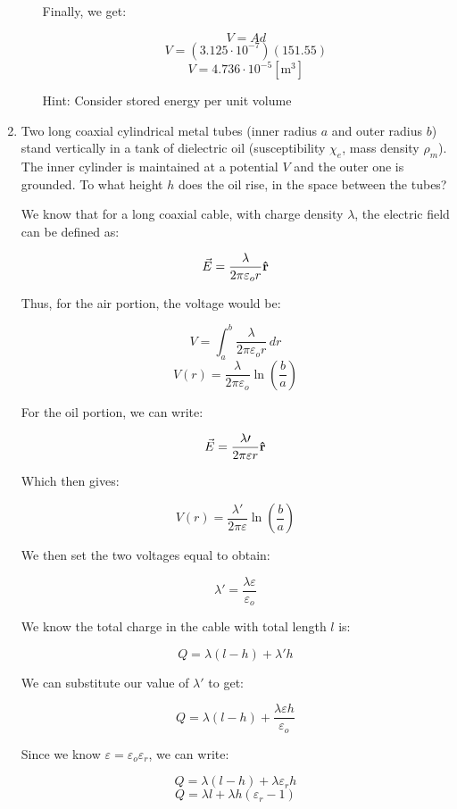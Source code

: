 \begin{enumerate}
\begin{enumerate}
        Finally, we get:

        $$V=Ad$$
        $$V=\left( 3.125\cdot10^{-7} \right)\left( 151.55 \right)$$
        $$\boxed{V=4.736\cdot10^{-5}[\si{\meter\cubed}]}$$

      Hint: Consider stored energy per unit volume

    \end{enumerate}

  \item Two long coaxial cylindrical metal tubes (inner radius $a$ and outer radius $b$) stand vertically in a tank of dielectric oil (susceptibility $\chi_e$, mass density $\rho_m$).  The inner cylinder is maintained at a potential $V$ and the outer one is grounded. To what height $h$ does the oil rise, in the space between the tubes?

    We know that for a long coaxial cable, with charge density $\lambda$, the electric field can be defined as:

    $$\vec{E}=\frac{\lambda}{2\pi\varepsilon_o r}\bold{\hat{r}}$$

    Thus, for the air portion, the voltage would be:

    $$V=\int_a^b \frac{\lambda}{2\pi\varepsilon_o r}\,dr$$
    $$V(r)=\frac{\lambda}{2\pi\varepsilon_o}\ln\left( \frac{b}{a} \right)$$

    For the oil portion, we can write:

    $$\vec{E}=\frac{\lambda\prime}{2\pi\varepsilon r}\bold{\hat{r}}$$

    Which then gives:

    $$V(r)=\frac{\lambda\prime}{2\pi\varepsilon}\ln\left( \frac{b}{a} \right)$$

    We then set the two voltages equal to obtain:

    $$\lambda\prime=\frac{\lambda\varepsilon}{\varepsilon_o}$$

    We know the total charge in the cable with total length $l$ is:

    $$Q=\lambda(l-h)+\lambda\prime h$$

    We can substitute our value of $\lambda\prime$ to get:

    $$Q=\lambda(l-h)+\frac{\lambda\varepsilon h}{\varepsilon_o}$$

    Since we know $\varepsilon=\varepsilon_o\varepsilon_r$, we can write:

    $$Q=\lambda(l-h)+\lambda\varepsilon_r h$$
    $$Q=\lambda l+\lambda h(\varepsilon_r-1)$$


\end{enumerate}
